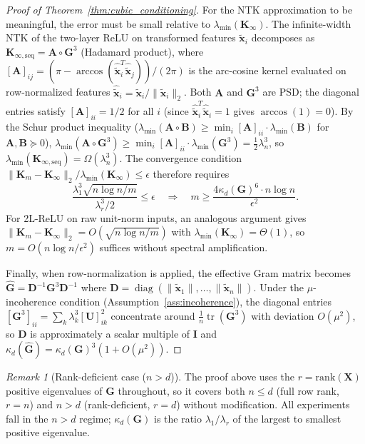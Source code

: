 \documentclass{article}
\theoremstyle{plain}
\theoremstyle{definition}
\theoremstyle{remark}
\newtheorem{remark}[theorem]{Remark}
\begin{document}
\begin{proof}[Proof of Theorem~\ref{thm:cubic_conditioning}]
For the NTK approximation to be meaningful, the error must be small relative to $\lambda_{\min}(\mathbf{K}_\infty)$. The infinite-width NTK of the two-layer ReLU on transformed features $\tilde{\mathbf{x}}_i$ decomposes as $\mathbf{K}_{\infty,\text{seq}} = \mathbf{A} \circ \mathbf{G}^3$ (Hadamard product), where $[\mathbf{A}]_{ij} = (\pi - \arccos(\hat{\tilde{\mathbf{x}}}_i^T\hat{\tilde{\mathbf{x}}}_j))/(2\pi)$ is the arc-cosine kernel evaluated on row-normalized features $\hat{\tilde{\mathbf{x}}}_i = \tilde{\mathbf{x}}_i/\|\tilde{\mathbf{x}}_i\|_2$. Both $\mathbf{A}$ and $\mathbf{G}^3$ are PSD; the diagonal entries satisfy $[\mathbf{A}]_{ii} = 1/2$ for all $i$ (since $\hat{\tilde{\mathbf{x}}}_i^T\hat{\tilde{\mathbf{x}}}_i = 1$ gives $\arccos(1) = 0$). By the Schur product inequality \citep{horn1994topics} ($\lambda_{\min}(\mathbf{A}\circ\mathbf{B}) \geq \min_i[\mathbf{A}]_{ii}\cdot\lambda_{\min}(\mathbf{B})$ for $\mathbf{A},\mathbf{B}\succeq 0$), $\lambda_{\min}(\mathbf{A} \circ \mathbf{G}^3) \geq \min_i [\mathbf{A}]_{ii} \cdot \lambda_{\min}(\mathbf{G}^3) = \frac{1}{2}\lambda_n^3$, so $\lambda_{\min}(\mathbf{K}_{\infty,\text{seq}}) = \Omega(\lambda_n^3)$. The convergence condition $\|\mathbf{K}_m - \mathbf{K}_\infty\|_2 / \lambda_{\min}(\mathbf{K}_\infty) \leq \epsilon$ therefore requires
$$\frac{\lambda_1^3\sqrt{n\log n / m}}{\lambda_r^3/2} \leq \epsilon \quad \Longrightarrow \quad m \geq \frac{4\kappa_d(\mathbf{G})^6 \cdot n\log n}{\epsilon^2}.$$
For 2L-ReLU on raw unit-norm inputs, an analogous argument gives $\|\mathbf{K}_m - \mathbf{K}_\infty\|_2 = O(\sqrt{n\log n / m})$ with $\lambda_{\min}(\mathbf{K}_\infty) = \Theta(1)$, so $m = O(n\log n / \epsilon^2)$ suffices without spectral amplification.

Finally, when row-normalization is applied, the effective Gram matrix becomes $\hat{\mathbf{G}} = \mathbf{D}^{-1}\mathbf{G}^3\mathbf{D}^{-1}$ where $\mathbf{D} = \operatorname{diag}(\|\tilde{\mathbf{x}}_1\|, \ldots, \|\tilde{\mathbf{x}}_n\|)$. Under the $\mu$-incoherence condition (Assumption~\ref{ass:incoherence}), the diagonal entries $[\mathbf{G}^3]_{ii} = \sum_k \lambda_k^3 [\mathbf{U}]_{ik}^2$ concentrate around $\frac{1}{n}\operatorname{tr}(\mathbf{G}^3)$ with deviation $O(\mu^2)$, so $\mathbf{D}$ is approximately a scalar multiple of $\mathbf{I}$ and $\kappa_d(\hat{\mathbf{G}}) = \kappa_d(\mathbf{G})^3(1 + O(\mu^2))$.
\end{proof}

\begin{remark}[Rank-deficient case ($n > d$)]
\label{rmk:rank_deficient}
The proof above uses the $r = \mathrm{rank}(\mathbf{X})$ positive eigenvalues of $\mathbf{G}$ throughout, so it covers both $n \leq d$ (full row rank, $r = n$) and $n > d$ (rank-deficient, $r = d$) without modification. All experiments fall in the $n > d$ regime; $\kappa_d(\mathbf{G})$ is the ratio $\lambda_1/\lambda_r$ of the largest to smallest positive eigenvalue.
\end{remark}
\end{document}
